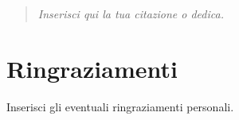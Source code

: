 \vspace*{\fill} 
\begin{quote} 
    \centering 
    \begin{flushright}{
                        \slshape  
                        Inserisci qui la tua citazione o dedica.
                      }
    \end{flushright}
\end{quote}
\vspace*{\fill}

\clearpage{\pagestyle{plain}\cleardoublepage}

\chapter*{Ringraziamenti}
Inserisci gli eventuali ringraziamenti personali.
	